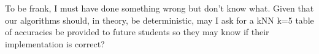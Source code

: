 \documentclass[a4paper]{article}
\theoremstyle{definition}
\newenvironment{soln}{
    \leavevmode\color{blue}\ignorespaces
}{}
\begin{document}
\begin{enumerate}
	\begin{soln} 
            To be frank, I must have done something wrong but don't know what.
            Given that our algorithms should, in theory, be deterministic, may I ask for a kNN k=5 table of accuracies be provided to future students so they may know if their implementation is correct?
        \end{soln}
	
\end{enumerate}

\end{document}
